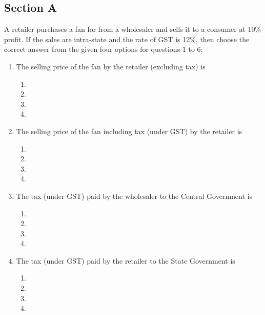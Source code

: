 \documentclass[12pt]{article}
\begin{document}
\begin{multicols}{2}
\section*{Section A}

 A retailer purchases a fan for  from a wholesaler and sells it to a consumer at 10\% profit. If the sales are intra-state and the rate of GST is 12\%, then choose the correct answer from the given four options for questions 1 to 6:

\begin{enumerate}[label=\textbf{\arabic*.}]
\item The selling price of the fan by the retailer (excluding tax) is
\begin{enumerate}[label=(\alph*)]
\item {}
\item {}
\item {}
\item {}
\end{enumerate}

\item The selling price of the fan including tax (under GST) by the retailer is
\begin{enumerate}[label=(\alph*)]
\item {}
\item {}
\item {}
\item {}
\end{enumerate}

\item The tax (under GST) paid by the wholesaler to the Central Government is
\begin{enumerate}[label=(\alph*)]
\item {}
\item {}
\item {}
\item {}
\end{enumerate}

\item The tax (under GST) paid by the retailer to the State Government is
\begin{enumerate}[label=(\alph*)]
\item {}
\item {}
\item {}
\item {}
\end{enumerate}


\end{enumerate}
\end{multicols}
\end{document}
